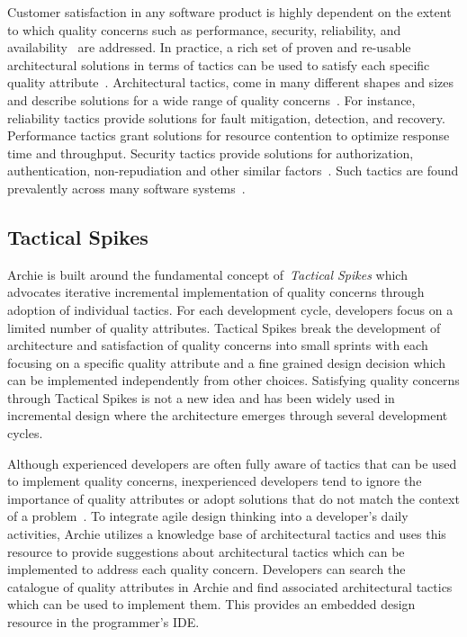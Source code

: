 Customer satisfaction in any software product is highly dependent on the extent to which quality concerns such as performance, security, reliability, and availability~\cite{kruchten2004} are addressed. In practice, a rich set of proven and re-usable architectural solutions in terms of tactics can be used to satisfy each specific quality attribute~\cite{bass:arch12}. Architectural tactics, come in many different shapes and sizes and describe solutions for a wide range of quality concerns~\cite{Hanmer}. For instance, reliability tactics provide solutions for fault mitigation, detection, and recovery. Performance tactics grant solutions for resource contention to optimize response time and throughput. Security tactics provide solutions for authorization, authentication, non-repudiation and other similar factors~\cite{Hanmer}. Such tactics are found prevalently across many software systems~\cite{ICSE2012}.

\subsection{Tactical Spikes}
Archie is built around the fundamental concept of~\emph{Tactical Spikes} which advocates iterative incremental implementation of quality concerns through adoption of individual tactics. For each development cycle, developers focus on a limited number of quality attributes. Tactical Spikes break the development of architecture and satisfaction of quality concerns into small sprints with each focusing on a specific quality attribute and a fine grained design decision which can be implemented independently from other choices. Satisfying quality concerns through Tactical Spikes is not a new idea and has been widely used in incremental design where the architecture emerges through several development cycles.

Although experienced developers are often fully aware of tactics that can be used to implement quality concerns, inexperienced developers tend to ignore the importance of quality attributes or adopt solutions that do not match the context of a problem~\cite{FSE2012}. To integrate agile design thinking into a developer's daily activities, Archie utilizes a knowledge base of architectural tactics and uses this resource to provide suggestions about architectural tactics which can be implemented to address each quality concern. Developers can search the catalogue of quality attributes in Archie and find associated architectural tactics which can be used to implement them. This provides an embedded design resource in the programmer's IDE. 

